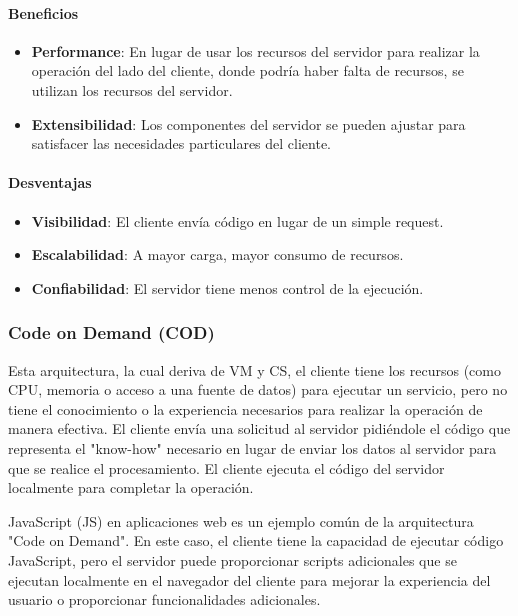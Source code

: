\documentclass{article}
\begin{document}
		\paragraph{Beneficios}
		\begin{itemize}	
			\item {\textbf{Performance}}: En lugar de usar los recursos del servidor para realizar la operación del lado del cliente, donde podría haber falta de recursos, se utilizan los recursos del servidor.
			
			\item {\textbf{Extensibilidad}}: Los componentes del servidor se pueden ajustar para satisfacer las necesidades particulares del cliente.
			
		\end{itemize}
		
		\paragraph{Desventajas}
			\begin{itemize}	
				\item {\textbf{Visibilidad}}: El cliente envía código en lugar de un simple request.			
				\item {\textbf{Escalabilidad}}: A mayor carga, mayor consumo de recursos.	
				\item {\textbf{Confiabilidad}}: El servidor tiene menos control de la ejecución.	
			\end{itemize}
		
		
		\subsubsection{Code on Demand (COD)}\label{sec:code_on_demand}
		Esta arquitectura, la cual deriva de VM y CS, el cliente tiene los recursos (como CPU, memoria o acceso a una fuente de datos) para ejecutar un servicio, pero no tiene el conocimiento o la experiencia necesarios para realizar la operación de manera efectiva. El cliente envía una solicitud al servidor pidiéndole el código que representa el "know-how" necesario en lugar de enviar los datos al servidor para que se realice el procesamiento. El cliente ejecuta el código del servidor localmente para completar la operación.
		
		JavaScript (JS) en aplicaciones web es un ejemplo común de la arquitectura "Code on Demand". En este caso, el cliente tiene la capacidad de ejecutar código JavaScript, pero el servidor puede proporcionar scripts adicionales que se ejecutan localmente en el navegador del cliente para mejorar la experiencia del usuario o proporcionar funcionalidades adicionales.
		
\end{document}
